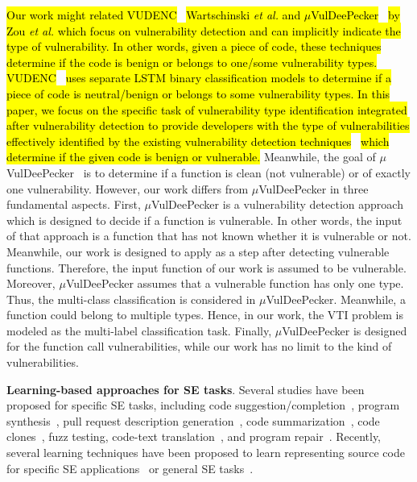 \hl{Our work might related VUDENC}~\cite{VUDENC} \hl{Wartschinski \textit{et al.} and $\mu$VulDeePecker}~\cite{mu_vuldeeppeker} \hl{by Zou \textit{et al.} which focus on vulnerability detection and can implicitly indicate the type of vulnerability. In other words, given a piece of code, these techniques determine if the code is benign or belongs to one/some vulnerability types. VUDENC}~\cite{VUDENC} \hl{uses separate LSTM binary classification models to determine if a piece of code is neutral/benign or belongs to some vulnerability types. 
%
%
In this paper, we focus on the specific task of vulnerability type identification integrated after vulnerability detection to provide developers with the type of vulnerabilities effectively identified by the existing vulnerability detection techniques}~\cite{vuldeeppeaker,sysevr,ivdetect,linevul,linevd} \hl{which determine if the given code is benign or vulnerable. }
%
%
Meanwhile, the goal of $\mu$VulDeePecker~\cite{mu_vuldeeppeker} is to determine if a function is clean (not vulnerable) or of exactly one vulnerability. However, our work differs from $\mu$VulDeePecker in three fundamental aspects. First, $\mu$VulDeePecker is a vulnerability detection approach which is designed to decide if a function is vulnerable. In other words, the input of that approach is a function that has not known whether it is vulnerable or not. Meanwhile, our work is designed to apply as a step after detecting vulnerable functions. Therefore, the input function of our work is assumed to be vulnerable. Moreover, $\mu$VulDeePecker assumes that a vulnerable function has only one type. Thus, the multi-class classification is considered in $\mu$VulDeePecker. Meanwhile, a function could belong to multiple types. Hence, in our work, the VTI problem is modeled as the multi-label classification task. Finally, $\mu$VulDeePecker is designed for the function call vulnerabilities, while our work has no limit to the kind of vulnerabilities.


\textbf{Learning-based approaches for SE tasks}. Several studies have been proposed for specific SE tasks, including code suggestion/completion~\cite{icse20, naturalness, autosc, apsec21,arist}, program synthesis~\cite{gvero2015synthesizing}, pull request description generation~\cite{hu2018deep,liu2019automatic}, code summarization~\cite{iyer2016summarizing,mastropaolo2021studying,wan2018improving}, code clones~\cite{li2017cclearner}, fuzz testing\cite{godefroid2017learn}, code-text translation~\cite{ase22}, and program repair~\cite{jiang2021cure,ding2020patching}.
%
Recently, several learning techniques have been proposed to learn representing source code for specific SE applications~\cite{oppsla19, code2vec} or general SE tasks~\cite{codebert,cubert,infercode}.